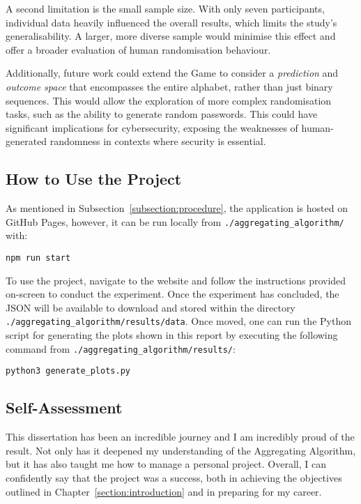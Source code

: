 A second limitation is the small sample size. With only seven participants, individual data heavily influenced the overall results, which limits the study's generalisability. A larger, more diverse sample would minimise this effect and offer a broader evaluation of human randomisation behaviour.

Additionally, future work could extend the Game to consider a \textit{prediction} and \textit{outcome space} that encompasses the entire alphabet, rather than just binary sequences. This would allow the exploration of more complex randomisation tasks, such as the ability to generate random passwords. This could have significant implications for cybersecurity, exposing the weaknesses of human-generated randomness in contexts where security is essential.

\subsection{How to Use the Project}\label{subsection:how_to_use_the_project}
As mentioned in Subsection~\ref{subsection:procedure}, the application is hosted on GitHub Pages, however, it can be run locally from \verb|./aggregating_algorithm/| with:
\begin{center}
    \verb|npm run start|
\end{center}

To use the project, navigate to the website and follow the instructions provided on-screen to conduct the experiment. Once the experiment has concluded, the JSON will be available to download and stored within the directory \verb|./aggregating_algorithm/results/data|. Once moved, one can run the Python script for generating the plots shown in this report by executing the following command from \verb|./aggregating_algorithm/results/|:

\begin{center}
    \verb|python3 generate_plots.py|
\end{center}

\subsection{Self-Assessment}\label{subsection:self-assessment}
This dissertation has been an incredible journey and I am incredibly proud of the result. Not only has it deepened my understanding of the Aggregating Algorithm, but it has also taught me how to manage a personal project. Overall, I can confidently say that the project was a success, both in achieving the objectives outlined in Chapter~\ref{section:introduction} and in preparing for my career. 

